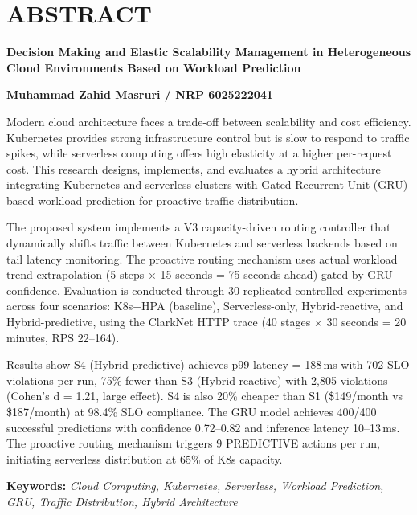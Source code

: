 
\clearpage


\section*{\large \centering \MakeUppercase 
    {Abstract}
}

\begin{center}

    \justifying \normalsize

    \textbf{Decision Making and Elastic Scalability Management in Heterogeneous Cloud Environments Based on Workload Prediction}

    \vspace{0.5cm}

    \textbf{Muhammad Zahid Masruri / NRP 6025222041}

    \vspace{0.5cm}

    Modern cloud architecture faces a trade-off between scalability and cost efficiency. Kubernetes provides strong infrastructure control but is slow to respond to traffic spikes, while serverless computing offers high elasticity at a higher per-request cost. This research designs, implements, and evaluates a hybrid architecture integrating Kubernetes and serverless clusters with Gated Recurrent Unit (GRU)-based workload prediction for proactive traffic distribution.

    The proposed system implements a V3 capacity-driven routing controller that dynamically shifts traffic between Kubernetes and serverless backends based on tail latency monitoring. The proactive routing mechanism uses actual workload trend extrapolation (5 steps $\times$ 15 seconds = 75 seconds ahead) gated by GRU confidence. Evaluation is conducted through 30 replicated controlled experiments across four scenarios: K8s+HPA (baseline), Serverless-only, Hybrid-reactive, and Hybrid-predictive, using the ClarkNet HTTP trace (40 stages $\times$ 30 seconds = 20 minutes, RPS 22--164).

    Results show S4 (Hybrid-predictive) achieves p99 latency = 188\,ms with 702 SLO violations per run, 75\% fewer than S3 (Hybrid-reactive) with 2,805 violations (Cohen's d = 1.21, large effect). S4 is also 20\% cheaper than S1 (\$149/month vs \$187/month) at 98.4\% SLO compliance. The GRU model achieves 400/400 successful predictions with confidence 0.72--0.82 and inference latency 10--13\,ms. The proactive routing mechanism triggers 9 PREDICTIVE actions per run, initiating serverless distribution at 65\% of K8s capacity.

    \vspace{0.5cm}

    \textbf{Keywords:} \emph{Cloud Computing, Kubernetes, Serverless, Workload Prediction, GRU, Traffic Distribution, Hybrid Architecture}

\end{center}

\clearpage
